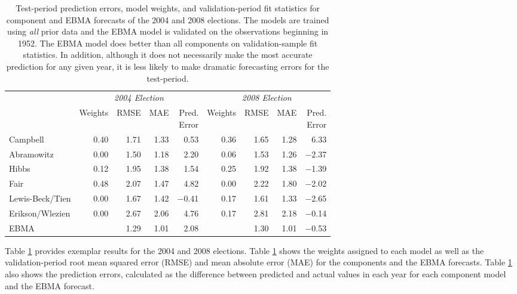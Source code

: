 \begin{table}[ht!]
  \caption{\footnotesize Test-period prediction errors, model weights, and validation-period fit 
    statistics for component and EBMA forecasts  of the 2004 and 2008  
    elections. The models are trained using \textit{all} prior data and the 
    EBMA model is validated on the observations beginning in 1952.  
    The EBMA model does better than all components on 
    validation-sample fit statistics.  In addition, although it does not 
    necessarily make the most accurate prediction for any given year,
    it is less likely to make  dramatic forecasting errors for the test-period.}
\label{Pres-Year-Res} \small
\begin{center}
\begin{tabular}{l rrrrrrrr}	
  \toprule
   &\multicolumn{4}{c}{\textit{2004 Election}} &\multicolumn{4}{c}{\textit{2008 Election}} \\ 
 &	Weights&	RMSE &MAE &\shortstack{Pred. \\ Error}
 &Weights&	RMSE&	MAE &  \shortstack{Pred.\\  Error}\\
\midrule
 Campbell               &0.40&1.71&1.33 &0.53&0.36&1.65&1.28&6.33\\
  Abramowitz        	&0.00&1.50&1.18&2.20&0.06&1.53&1.26&$-$2.37\\
  Hibbs                   	&0.12&1.95&1.38&1.54&0.25&1.92&1.38&$-$1.39\\
  Fair                      	&0.48&2.07&1.47&4.82&0.00&2.22&1.80&$-$2.02 \\
  Lewis-Beck/Tien 	&0.00&1.67&1.42&$-$0.41&	0.17&1.61&1.33&$-$2.65\\
  Erikson/Wlezien 	&0.00&2.67&2.06&4.76&0.17&2.81&2.18&$-$0.14\\
   EBMA                    	&	       	&1.29&1.01&2.08&
  &1.30&1.01&$-$0.53\\
\bottomrule
\end{tabular}
 \end{center}
 \end{table}



 Table \ref{Pres-Year-Res} provides exemplar results for the 2004 and
 2008 elections.  Table \ref{Pres-Year-Res} shows the weights assigned
 to each model as well as the validation-period root mean squared
 error (RMSE) and mean absolute error (MAE) for the components and the
 EBMA forecasts. Table \ref{Pres-Year-Res} also shows
 the prediction errors, calculated as the difference between predicted
 and actual values in each year for each component model and the EBMA
 forecast.

